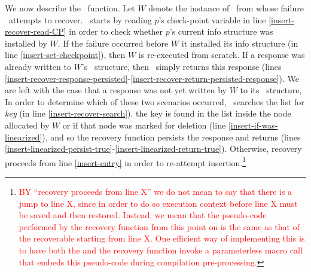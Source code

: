 We now describe the \insertrecover\ function. Let $W$ denote the instance 
of \insertlst\ from whose failure  \insertrecover\ attempts to recover. 
\insertrecover\ starts by reading $p$'s check-point variable 
in line \ref{insert-recover-read-CP} in order to check 
whether $p$'s current info structure was installed by $W$. 
If the failure occurred before $W$  
it installed its info structure 
(in line \ref{insert-set-checkpoint}), then $W$ is re-executed from scratch. 
If a response was already written to $W$'s \Info\ structure, 
then \insertrecover\ simply returns this response 
(lines \ref{insert-recover-response-persisted}-\ref{insert-recover-return-persisted-response}). 
We are left with the case that a response was not yet written by $W$ to its \Info\ structure, 
In order to determine which of these two scenarios occurred, 
\insertrecover\ searches the list for \emph{key} (in line \ref{insert-recover-search}). 
 the key is found in the list inside the node allocated 
by $W$ or if that node was marked for deletion (line \ref{insert-if-was-linearized}), 
and so the recovery function persists the response 
and returns \True (lines \ref{insert-linearized-persist-true}-\ref{insert-linearized-return-true}). 
Otherwise, recovery proceeds from line \ref{insert-entry}
in order to re-attempt insertion.\footnote{\textcolor{red}{BY ``recovery proceeds from line X'' we do not mean 
to say that there is a jump to line X, since in order to do so execution context 
before line X must be saved and then restored. Instead, we mean that the pseudo-code performed 
by the recovery function from this point on is the same as that of the recoverable 
starting from line X. One efficient way of implementing this is to have 
both the  and the recovery function invoke a parameterless macro call 
that embeds this pseudo-code during compilation pre-processing.}}

